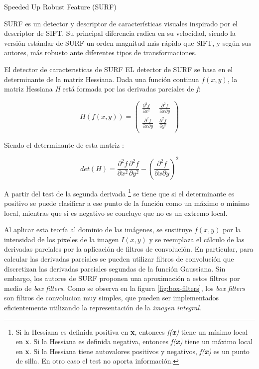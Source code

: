 \begin{subsection}
{Speeded Up Robust Feature (SURF)}

SURF\cite{bay2008speeded} es un detector y descriptor de características visuales inspirado por el descriptor de SIFT\cite{Lowe04}. Su principal diferencia radica en su velocidad, siendo la versión estándar de SURF un orden magnitud más rápido que SIFT, y según sus autores, más robusto ante diferentes tipos de transformaciones. 

\begin{subsection} 
{El detector de caracterısticas de SURF}
EL detector de SURF se basa en el determinante de la matriz Hessiana. Dada una función continua $ f(x, y) $, la matriz Hessiana \textit{H} está formada por las derivadas parciales de \textit{f}:

\begin{equation}
H(f(x, y)) = 
\left(
\begin{array}{cc}
\frac{\partial^2 f}{\partial x^2} & \frac{\partial^2 f}{{\partial x}{\partial y}}  \\
\frac{\partial^2 f}{{\partial x}{\partial y}} & \frac{\partial^2 f}{\partial y^2}  \\
\end{array}
\right)
\end{equation}

Siendo el determinante de esta matriz : 

\begin{equation}
det(H) = \frac{\partial^2 f}{\partial x^2} \frac{\partial^2 f}{\partial y^2} 
	     - \left( \frac{\partial^2 f}{{\partial x}{\partial y}} \right)^ 2
\end{equation}

A partir del test de la segunda derivada 
\footnote{Si la Hessiana es definida positiva en \textbf{x}, entonces \textit{f(\textbf{x})} tiene un mínimo local en \textbf{x}. Si la Hessiana es definida negativa, entonces \textit{f(\textbf{x})} tiene un máximo local en \textbf{x}. Si la Hessiana tiene autovalores positivos y negativos, \textit{f(\textbf{x})} es un punto de silla. En otro caso el test no aporta información.} 
se tiene que si el determinante es positivo se puede clasificar a ese punto de la función como un máximo o mínimo local, mientras que si es negativo se concluye que no es un extremo local.

Al aplicar esta teoría al dominio de las imágenes, se sustituye $f(x,y)$ por la intensidad de los pixeles de la imagen $I(x,y)$ y se reemplaza el cálculo de las derivadas parciales por la aplicación de filtros de convolución. En particular, para calcular las derivadas parciales se pueden utilizar filtros de convolución que discretizan las derivadas parciales segundas de la función Gaussiana. Sin embargo, los autores de SURF proponen una aproximación a estos filtros por medio de \textit{box filters}. Como se observa en la figura \ref{fig:box-filters}, los \textit{box filters} son filtros de convolucion muy simples, que pueden ser implementados eficientemente utilizando la representación de la \textit{imagen integral}\cite{wiki-imagen-integral}.


\end{subsection}
\end{subsection}
